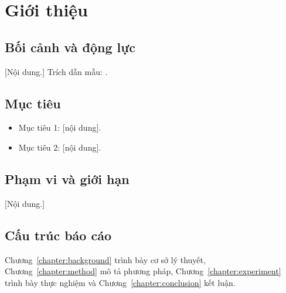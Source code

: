 \chapter{Giới thiệu}\label{chapter:introduction}
\pagestyle{fancy}

\section{Bối cảnh và động lực}
[Nội dung.] Trích dẫn mẫu: \cite{sample2024}.

\section{Mục tiêu}
\begin{itemize}
    \item Mục tiêu 1: [nội dung].
    \item Mục tiêu 2: [nội dung].
\end{itemize}

\section{Phạm vi và giới hạn}
[Nội dung.]

\section{Cấu trúc báo cáo}
Chương~\ref{chapter:background} trình bày cơ sở lý thuyết, Chương~\ref{chapter:method} mô tả phương pháp, Chương~\ref{chapter:experiment} trình bày thực nghiệm và Chương~\ref{chapter:conclusion} kết luận.
